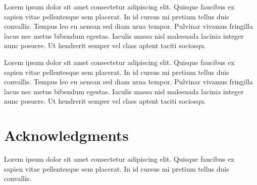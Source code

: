 \documentclass[sigconf,nonacm]{acmart} %
\begin{document}
Lorem ipsum dolor sit amet consectetur adipiscing elit. 
Quisque faucibus ex sapien vitae pellentesque sem placerat. 
In id cursus mi pretium tellus duis convallis. 
Tempus leo eu aenean sed diam urna tempor. 
Pulvinar vivamus fringilla lacus nec metus bibendum egestas. 
Iaculis massa nisl malesuada lacinia integer nunc posuere. 
Ut hendrerit semper vel class aptent taciti sociosqu.

Lorem ipsum dolor sit amet consectetur adipiscing elit. 
Quisque faucibus ex sapien vitae pellentesque sem placerat. 
In id cursus mi pretium tellus duis convallis. 
Tempus leo eu aenean sed diam urna tempor. 
Pulvinar vivamus fringilla lacus nec metus bibendum egestas. 
Iaculis massa nisl malesuada lacinia integer nunc posuere. 
Ut hendrerit semper vel class aptent taciti sociosqu. 

\section*{Acknowledgments}
Lorem ipsum dolor sit amet consectetur adipiscing elit. 
Quisque faucibus ex sapien vitae pellentesque sem placerat. 
In id cursus mi pretium tellus duis convallis. 


\end{document}
